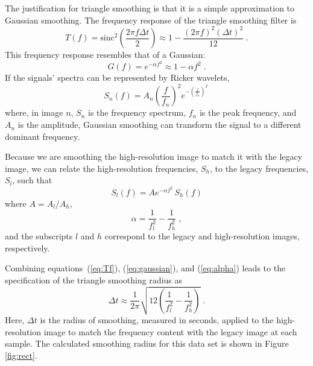     
    The justification for triangle smoothing is that it is a simple approximation to Gaussian smoothing. The frequency response of the triangle smoothing filter \cite[]{pvi} is
    \begin{equation}
        \label{eq:Tf}
        T(f) = \mathrm{sinc}^2\left(\frac{2\pi f \Delta t}{2}\right) \approx 1-\frac{(2\pi f)^2(\Delta t)^2}{12}\;.
    \end{equation}
    This frequency response resembles that of a Gaussian:
    \begin{equation}
        \label{eq:gaussian}
        G(f) = e^{-\alpha f^2} \approx 1 - \alpha f^2\;.
    \end{equation}
    If the signals' spectra can be represented by Ricker wavelets,
    \begin{equation} 
        \label{eq:Sn}
        S_{n}(f) = A_{n} \left(\frac{f}{f_{n}}\right)^2e^{-\left(\frac{f}{f_{n}}\right)^{2}}\,
    \end{equation}
    where, in image $n$, $S_n$ is the frequency spectrum, $f_n$ is the peak frequency, and $A_n$ is the amplitude, Gaussian smoothing can transform the signal to a different dominant frequency.
    
    Because we are smoothing the high-resolution image to match it with the legacy image, we can relate the high-resolution frequencies, $S_h$, to the legacy frequencies, $S_l$, such that
    \begin{equation} 
        \label{eq:smooth}
        S_{l}(f)=A e^{-\alpha f^2}\,S_h(f)      
    \end{equation}
    where $A=A_l/A_h$,
    \begin{equation}
        \label{eq:alpha}
        \alpha = \frac{1}{f_l^2}-\frac{1}{f_h^2} \;,
    \end{equation}
    and the subscripts $l$ and $h$ correspond to the legacy and high-resolution images, respectively.
    
    Combining equations~(\ref{eq:Tf}), (\ref{eq:gaussian}), and (\ref{eq:alpha}) leads to the specification of the triangle smoothing radius as
    \begin{equation}
        \label{eq:radius}
        \Delta t \approx \frac{1}{2\pi}\sqrt{12\left(\frac{1}{f_{l}^{2}}-\frac{1}{f_{h}^{2}}\right)}\;.
    \end{equation}
    Here, $\Delta t$ is the radius of smoothing, measured in seconds, applied to the high-resolution image to match the frequency content with the legacy image at each sample. 
    The calculated smoothing radius for this data set is shown in Figure \ref{fig:rect}.
    
